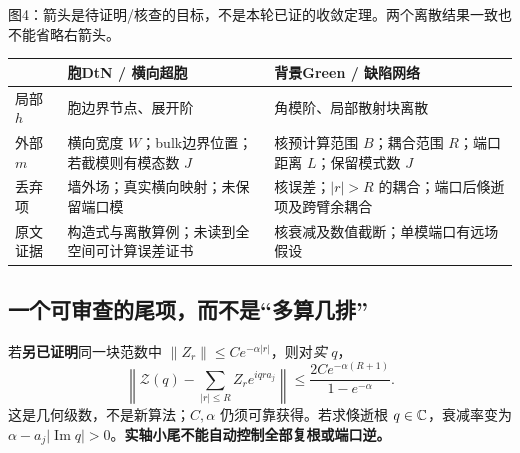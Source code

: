 \documentclass[UTF8,fontset=none,11pt,a4paper]{ctexart}
\begin{document}
\begin{center}
\end{center}
{\small 图4：箭头是待证明/核查的目标，不是本轮已证的收敛定理。两个离散结果一致也不能省略右箭头。}

\renewcommand{\arraystretch}{1.25}
\begin{tabularx}{\linewidth}{@{}p{22mm}XX@{}}
\toprule
 & 胞DtN / 横向超胞 & 背景Green / 缺陷网络\\
\midrule
局部 $h$ & 胞边界节点、展开阶 & 角模阶、局部散射块离散\\
外部 $m$ & 横向宽度 $W$；bulk边界位置；若截模则有模态数 $J$ & 核预计算范围 $B$；耦合范围 $R$；端口距离 $L$；保留模式数 $J$\\
丢弃项 & 墙外场；真实横向映射；未保留端口模 & 核误差；$|r|>R$ 的耦合；端口后倏逝项及跨臂余耦合\\
原文证据 & 构造式与离散算例；未读到全空间可计算误差证书 & 核衰减及数值截断；单模端口有远场假设\\
\bottomrule
\end{tabularx}

\subsection*{一个可审查的尾项，而不是“多算几排”}
若\textbf{另已证明}同一块范数中 $\|Z_r\|\le Ce^{-\alpha|r|}$，则对\emph{实} $q$，
\begin{equation}\label{eq:tail}
 \left\|\mathcal Z(q)-\sum_{|r|\le R}Z_re^{iqra_j}\right\|
 \le\frac{2Ce^{-\alpha(R+1)}}{1-e^{-\alpha}}.
\end{equation}
这是几何级数，不是新算法；$C,\alpha$ 仍须可靠获得。若求倏逝根 $q\in\mathbb C$，衰减率变为 $\alpha-a_j|\operatorname{Im}q|>0$。\textbf{实轴小尾不能自动控制全部复根或端口逆。}
\end{document}
